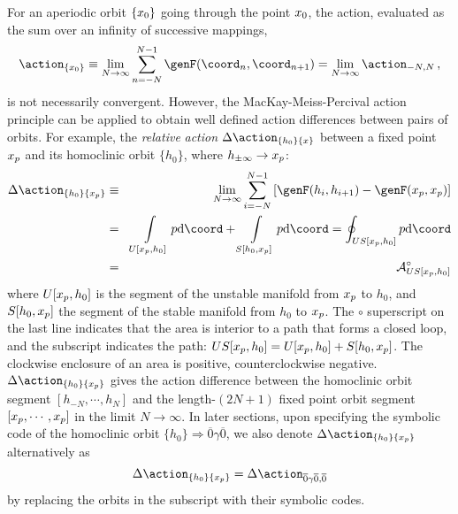 For an aperiodic orbit $\lbrace x_0\rbrace$ going through the point $x_0$,
the action, evaluated as the sum over an infinity of successive mappings,
\begin{equation}
\label{eq:full orbit action in general}
\action_{\lbrace \ssp_0 \rbrace}
\equiv \lim_{N \to \infty}
\sum_{n=-N}^{N-1} \genF(\coord_{n},\coord_{n+1})
=\lim_{N \to \infty} \action_{-N,N}
\,,
\end{equation}
is not necessarily convergent. However, the MacKay-Meiss-Percival action
principle can be applied to obtain well defined
action differences between pairs of orbits.  For example,
the {\em relative} {\em action}
$\Delta \action_{\lbrace h_0 \rbrace  \lbrace x \rbrace}$ between a fixed point $x_p$
and its homoclinic orbit $\lbrace h_{0} \rbrace$, where $h_{\pm
\infty}\to x_p$:
\begin{eqnarray}
\label{eq:relative action homoclinic}
\Delta \action_{\lbrace h_0 \rbrace  \lbrace \ssp_p \rbrace}
 &\equiv & \lim_{N \to \infty} \sum_{i=-N}^{N-1}\left[\genF(h_i,h_{i+1})-\genF(\ssp_p,\ssp_p)\right]
\nonumber \\
&=& \int\limits_{U[\ssp_p,h_{0}]}p\mathrm{d}\coord+\int\limits_{S[h_{0},\ssp_p]}p\mathrm{d}\coord
= \oint_{US[\ssp_p,h_{0}]} p\mathrm{d}\coord \nonumber \\
&=& {\cal A}^\circ_{US[\ssp_p,h_{0}]}
\end{eqnarray}
where $U[x_p,h_{0}]$ is the segment of the unstable manifold from $x_p$ to
$h_{0}$, and $S[h_{0},x_p]$ the segment of the stable manifold from $h_0$
to $x_p$.  The $\circ$ superscript on the last line indicates that the area
is interior to a path that forms a closed loop, and the subscript
indicates the path: $US[x_p,h_{0}]=U[x_p,h_{0}]+S[h_{0},x_p]$.  The
clockwise enclosure of an area is positive, counterclockwise negative.
$\Delta \action_{\lbrace h_0 \rbrace \lbrace \ssp_p \rbrace} $ gives the
action difference between the homoclinic orbit segment $[
h_{-N},\cdots,h_{N} ]$ and the length-$(2N+1)$ fixed point orbit segment
$[ x_p, \cdots, x_p ]$ in the limit $N \to \infty$. In later sections, upon
specifying the symbolic code of the homoclinic orbit $\lbrace h_0 \rbrace
\Rightarrow \overline{0} \gamma \overline{0}$, we also denote $\Delta
\action_{\lbrace h_0 \rbrace  \lbrace \ssp_p \rbrace}$ alternatively as
\begin{equation}\label{eq:relative action homoclinic symbolic notation}
\Delta \action_{\lbrace h_0 \rbrace  \lbrace \ssp_p \rbrace}
= \Delta \action_{\overline{0} \gamma \overline{0},  \overline{0}}
\end{equation}
by replacing the orbits in the subscript with their symbolic codes.

